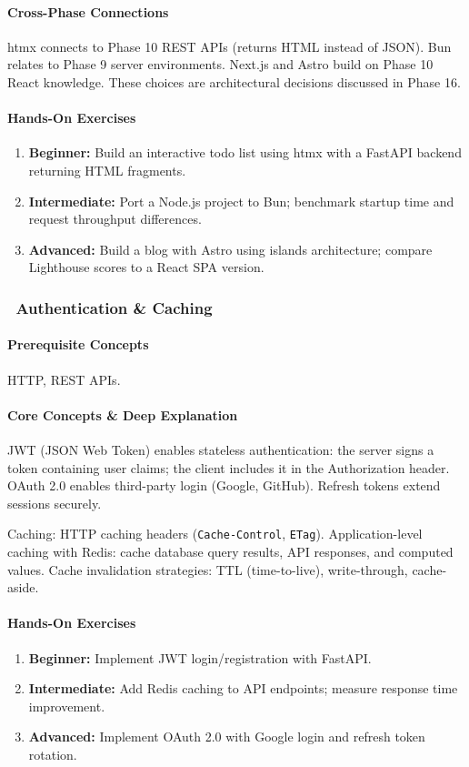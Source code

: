 \documentclass[11pt, a4paper, oneside]{report}
\newcommand{\mustmaster}[1]{\subsubsection{\texorpdfstring{\fcolorbox{blue!40!black}{blue!8}{\footnotesize\bfseries\color{blue!40!black} MUST MASTER}~#1}{#1}}}
\begin{document}
\paragraph{Cross-Phase Connections} htmx connects to Phase 10 REST APIs (returns HTML instead of JSON). Bun relates to Phase 9 server environments. Next.js and Astro build on Phase 10 React knowledge. These choices are architectural decisions discussed in Phase 16.

\paragraph{Hands-On Exercises}
\begin{enumerate}[leftmargin=*]
\item \textbf{Beginner:} Build an interactive todo list using htmx with a FastAPI backend returning HTML fragments.
\item \textbf{Intermediate:} Port a Node.js project to Bun; benchmark startup time and request throughput differences.
\item \textbf{Advanced:} Build a blog with Astro using islands architecture; compare Lighthouse scores to a React SPA version.
\end{enumerate}

\mustmaster{Authentication \& Caching}

\paragraph{Prerequisite Concepts} HTTP, REST APIs.

\paragraph{Core Concepts \& Deep Explanation} JWT (JSON Web Token) enables stateless authentication: the server signs a token containing user claims; the client includes it in the Authorization header. OAuth 2.0 enables third-party login (Google, GitHub). Refresh tokens extend sessions securely.

Caching: HTTP caching headers (\texttt{Cache-Control}, \texttt{ETag}). Application-level caching with Redis: cache database query results, API responses, and computed values. Cache invalidation strategies: TTL (time-to-live), write-through, cache-aside.

\paragraph{Hands-On Exercises}
\begin{enumerate}[leftmargin=*]
\item \textbf{Beginner:} Implement JWT login/registration with FastAPI.
\item \textbf{Intermediate:} Add Redis caching to API endpoints; measure response time improvement.
\item \textbf{Advanced:} Implement OAuth 2.0 with Google login and refresh token rotation.
\end{enumerate}
\end{document}
